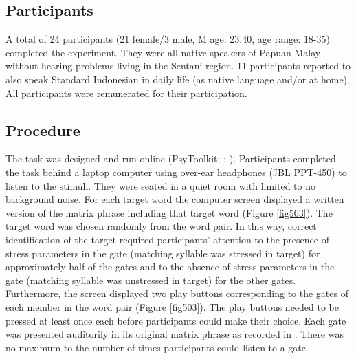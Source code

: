 \subsection{Participants}
A total of 24 participants (21 female/3 male, M age: 23.40, age range: 18-35) completed the experiment. They were all native speakers of Papuan Malay without hearing problems living in the Sentani region. 11 participants reported to also speak Standard Indonesian in daily life (as native language and/or at home). All participants were remunerated for their participation. 

\subsection{Procedure} \label{sec534}
The task was designed and run online (PsyToolkit; \citealt{stoet_psytoolkit_2010}; \citealt{stoet_psytoolkit_2017}). Participants completed the task behind a laptop computer using over-ear headphones (JBL PPT-450) to listen to the stimuli. They were seated in a quiet room with limited to no background noise. For each target word the computer screen displayed a written version of the matrix phrase including that target word (Figure \ref{fig503}). The target word was chosen randomly from the word pair. In this way, correct identification of the target required participants’ attention to the presence of stress parameters in the gate (matching syllable was stressed in target) for approximately half of the gates and to the absence of stress parameters in the gate (matching syllable was unstressed in target) for the other gates. Furthermore, the screen displayed two play buttons corresponding to the gates of each member in the word pair (Figure \ref{fig503}). The play buttons needed to be pressed at least once each before participants could make their choice. Each gate was presented auditorily in its original matrix phrase as recorded in \citet{kluge_papuan_2014}. There was no maximum to the number of times participants could listen to a gate. \par

